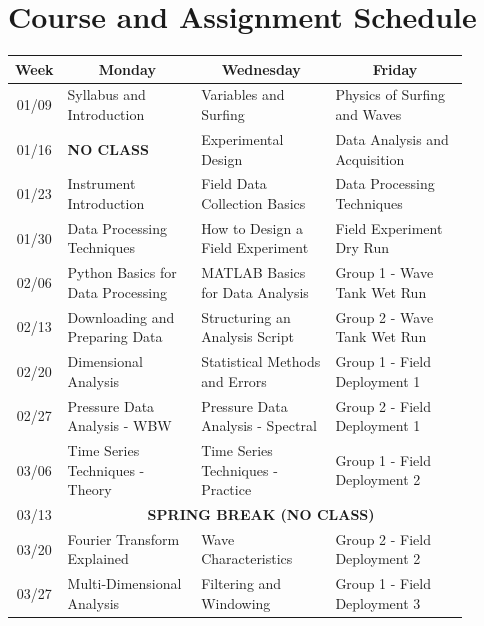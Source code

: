 \documentclass[
	letterpaper, %
	fontsize=10pt, %
	twoside=true, %
	numbers=noenddot, %
]{kaobook}
\begin{document}
\section*{Course and Assignment Schedule} 
\begin{table}[h!]
    \begin{tabular}{ c | p{0.3\linewidth} | p{0.3\linewidth} | p{0.3\linewidth} }
        \toprule
        \textbf{Week} & \multicolumn{1}{c|}{\textbf{Monday}} & \multicolumn{1}{|c|}{\textbf{Wednesday}} & \multicolumn{1}{|c}{\textbf{Friday}} \\
        \midrule
        01/09   & Syllabus and Introduction         & Variables and Surfing             & Physics of Surfing and Waves      \\
        01/16   & \textbf{NO CLASS}                 & Experimental Design               & Data Analysis and Acquisition     \\    
        01/23   & Instrument Introduction           & Field Data Collection Basics      & Data Processing Techniques        \\
        01/30   & Data Processing Techniques        & How to Design a Field Experiment  & Field Experiment Dry Run          \\
        02/06   & Python Basics for Data Processing & MATLAB Basics for Data Analysis   & Group 1 - Wave Tank Wet Run       \\
        02/13   & Downloading and Preparing Data    & Structuring an Analysis Script    & Group 2 - Wave Tank Wet Run       \\
        02/20   & Dimensional Analysis              & Statistical Methods and Errors    & Group 1 - Field Deployment 1      \\
        02/27   & Pressure Data Analysis - WBW      & Pressure Data Analysis - Spectral & Group 2 - Field Deployment 1      \\
        03/06   & Time Series Techniques - Theory   & Time Series Techniques - Practice & Group 1 - Field Deployment 2      \\
        \hline
        03/13   & \multicolumn{3}{c}{\textbf{SPRING BREAK (NO CLASS)}}                                                      \\
        \hline
        03/20   & Fourier Transform Explained       & Wave Characteristics              & Group 2 - Field Deployment 2      \\
        03/27   & Multi-Dimensional Analysis        & Filtering and Windowing           & Group 1 - Field Deployment 3      \\

\end{tabular}
\end{table}
\end{document}
